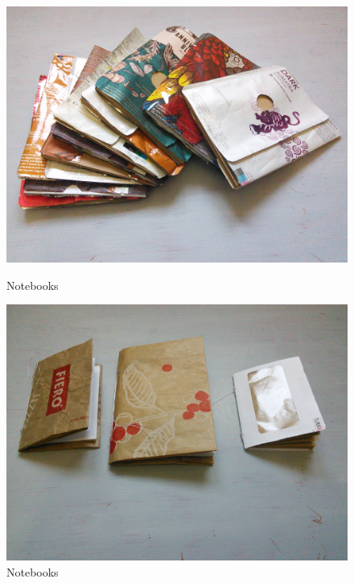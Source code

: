 \begin{figure}[!tbp]
  \centering
  \begin{minipage}[b]{0.48\textwidth}
    \includegraphics[width=\textwidth]{project_graphics/notebooks1.jpg}
    \caption{Notebooks}
    \label{fig:Notebooks1}
  \end{minipage}
  \hfill
  \begin{minipage}[b]{0.48\textwidth}
    \includegraphics[width=\textwidth]{project_graphics/notebooks2.jpg}
    \caption{Notebooks}
    \label{fig:Notebooks2}
  \end{minipage}
\end{figure}